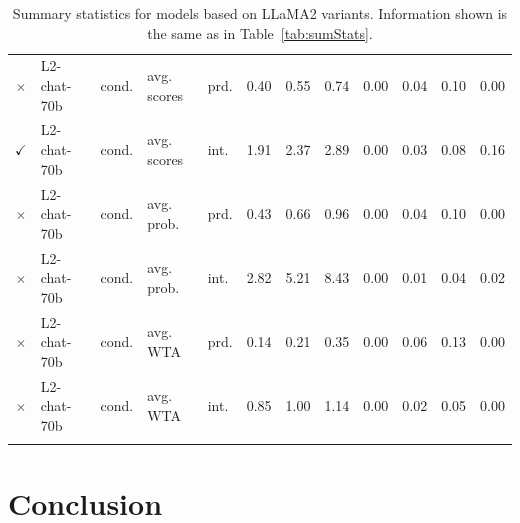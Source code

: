 \documentclass[fleqn]{article}
\begin{document}
\begin{table}[]
\begin{tabular}{cllllcrlcrlc}
  \textcolor{shimmer-main}{$\times$} & L2-chat-70b & cond. & avg. scores & prd. & 0.40  & 0.55   & 0.74   & 0.00 & 0.04 & 0.10 & 0.00 \\
  \textcolor{fern-main}{$\checkmark$} & L2-chat-70b & cond. & avg. scores & int. & 1.91  & 2.37   & 2.89   & 0.00 & 0.03 & 0.08 & 0.16 \\
  \textcolor{shimmer-main}{$\times$} & L2-chat-70b & cond. & avg. prob.  & prd. & 0.43  & 0.66   & 0.96   & 0.00 & 0.04 & 0.10 & 0.00 \\
  \textcolor{shimmer-main}{$\times$} & L2-chat-70b & cond. & avg. prob.  & int. & 2.82  & 5.21   & 8.43   & 0.00 & 0.01 & 0.04 & 0.02 \\
  \textcolor{shimmer-main}{$\times$} & L2-chat-70b & cond. & avg. WTA    & prd. & 0.14  & 0.21   & 0.35   & 0.00 & 0.06 & 0.13 & 0.00 \\
  \textcolor{shimmer-main}{$\times$} & L2-chat-70b & cond. & avg. WTA    & int. & 0.85  & 1.00   & 1.14   & 0.00 & 0.02 & 0.05 & 0.00 \\

   \bottomrule \\
\end{tabular}
\caption{
  Summary statistics for models based on LLaMA2 variants.
  Information shown is the same as in Table~\ref{tab:sumStats}.
}
\label{tab:sumStats-LLaMA2}
\end{table}


\section{Conclusion}
\label{sec:conclusion}
\end{document}
